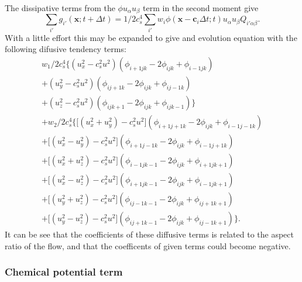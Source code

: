 The dissipative terms from the $\phi u_\alpha u_\beta$ term in the
second moment give
\begin{equation}
\sum_{i'} g_{i'} (\mathbf{x}; t + \Delta t) =
1/2c_s^4 \sum_{i'} w_i \phi (\mathbf{x} - \mathbf{c}_i \Delta t; t)
u_\alpha u_\beta Q_{i'\alpha\beta}.
\end{equation}
With a little effort this may be expanded to give and evolution
equation with the following difusive tendency terms:
\begin{eqnarray}
w_1/2c_s^4  \Big\{
(u_x^2 - c_s^2u^2)(\phi_{i+1 j k} - 2\phi_{ijk} + \phi_{i-1 j k}) \\+
(u_y^2 - c_s^2u^2)(\phi_{i j+1 k} - 2\phi_{ijk} + \phi_{i j-1 k}) \\+
(u_z^2 - c_s^2u^2)(\phi_{i j k+1} - 2\phi_{ijk} + \phi_{i j k-1}) \Big\}\\
+ w_2/2c_s^4 \Big\{
\big[ (u_x^2 + u_y^2) - c_s^2u^2\big]
(\phi_{i+1 j+1 k} - 2\phi_{ijk} + \phi_{i-1 j-1 k}) \\+
\big[ (u_x^2 - u_y^2) - c_s^2u^2 \big]
(\phi_{i+1 j-1 k} - 2\phi_{ijk} + \phi_{i-1 j+1 k}) \\+
\big[ (u_x^2 + u_z^2) - c_s^2u^2 \big]
(\phi_{i-1 j k-1} - 2\phi_{ijk} + \phi_{i+1 j k+1}) \\+
\big[ (u_x^2 - u_z^2) - c_s^2u^2 \big]
(\phi_{i+1 j k-1} - 2\phi_{ijk} + \phi_{i-1 j k+1}) \\+
\big[ (u_y^2 + u_z^2) - c_s^2u^2 \big]
(\phi_{i j-1 k-1} -2\phi_{ijk} + \phi_{i j+1 k+1}) \\+
\big[ (u_y^2 - u_z^2) - c_s^2u^2 \big]
(\phi_{i j+1 k-1} - 2\phi_{ijk} + \phi_{i j-1 k+1}) \Big\}.
\end{eqnarray}
It can be see that the coefficients of these diffusive terms is
related to the aspect ratio of the flow, and that the coefficents
of given terms could become negative.

\subsubsection{Chemical potential term}

